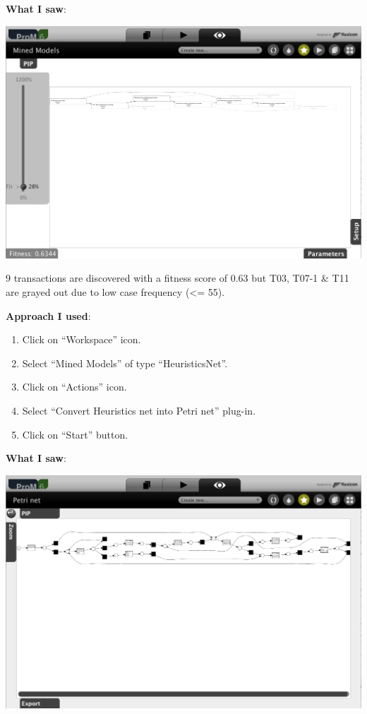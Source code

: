 \documentclass[]{article}
\begin{document}
\textbf{What I saw}:

\includegraphics{CoSeLoG_Step_05_Filter96_Heuristics_Net.png}

9 transactions are discovered with a fitness score of 0.63 but T03,
T07-1 \& T11 are grayed out due to low case frequency (\textless{}= 55).

\textbf{Approach I used}:

\begin{enumerate}
\def\labelenumi{\arabic{enumi}.}
\setcounter{enumi}{39}
\itemsep1pt\parskip0pt
\item
  Click on ``Workspace'' icon.\\
\item
  Select ``Mined Models'' of type ``HeuristicsNet''.\\
\item
  Click on ``Actions'' icon.\\
\item
  Select ``Convert Heuristics net into Petri net'' plug-in.\\
\item
  Click on ``Start'' button.
\end{enumerate}

\textbf{What I saw}:

\includegraphics{CoSeLoG_Step_05_Filter96_PetriNet_Heuristics.png}
\end{document}
